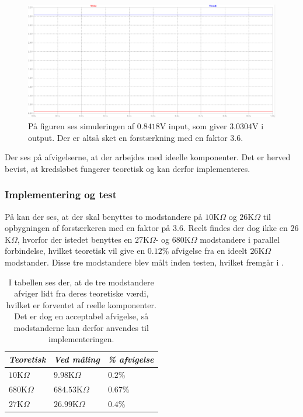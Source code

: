 \begin{figure}[H]
	\centering
	\includegraphics[scale=0.3]{figures/cProblemloesning/Forstaerker_faktor3_simulering.PNG}
	\caption{På figuren ses simuleringen af $0.8418$V input, som giver $3.0304$V i output. Der er altså sket en forstærkning med en faktor $3.6$.}
	\label{fig:faktor3_simulering}
\end{figure}
\noindent Der ses på afvigelserne, at der arbejdes med ideelle komponenter. Det er herved bevist, at kredsløbet fungerer teoretisk og kan derfor implementeres.

\subsubsection{Implementering og test}
På  kan der ses, at der skal benyttes to modstandere på $10$K$\Omega$ og $26$K$\Omega$ til opbygningen af forstærkeren med en faktor på 3.6. Reelt findes der dog ikke en $26$K$\Omega$, hvorfor der istedet benyttes en $27$K$\Omega$- og $680$K$\Omega$ modstandere i parallel forbindelse, hvilket teoretisk vil give en $0.12$\% afvigelse fra en ideelt $26$K$\Omega$ modstander. Disse tre modstandere blev målt inden testen, hvilket fremgår i .
\begin{table}[H]
	\centering
	\begin{tabular}{|l|l|l|}
		\hline
		\textit{Teoretisk}  & \textit{Ved måling} & \textit{\% afvigelse} \\ \hline
		$10$K$\Omega$       & $9.98$K$\Omega$     & $0.2$\%               \\ \hline
		$680$K$\Omega$      & $684.53$K$\Omega$   & $0.67$\%               \\ \hline
		$27$K$\Omega$       & $26.99$K$\Omega$    & $0.4$\%               \\ \hline
	\end{tabular}
	\caption{I tabellen ses der, at de tre modstandere afviger lidt fra deres teoretiske værdi, hvilket er forventet af reelle komponenter. Det er dog en acceptabel afvigelse, så modstanderne kan derfor anvendes til implementeringen.}
	\label{Tab:modstand_faktor18}
\end{table}

